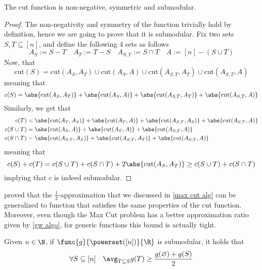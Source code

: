 \documentclass[a4paper, 12pt]{report}
\begin{document}
    \begin{framedprop}{}
        The cut function is non-negative, symmetric and submodular.
    \end{framedprop}

    \begin{proof}
        The non-negativity and symmetry of the function trivially hold by definition, hence we are going to prove that it is submodular. Fix two sets $S, T \subseteq [n]$, and define the following 4 sets as follows $$A_S := S - T \quad A_T := T - S \quad A_{S, T} := S \cap T \quad A := [n] - (S \cup T)$$ Now, that $$\mathrm{cut}(S) = \mathrm{cut}(A_S, A_T) \cup \mathrm{cut}(A_S, A) \cup \mathrm{cut}(A_{S, T}, A_T) \cup \mathrm{cut}(A_{S, T}, A)$$ meaning that $$c(S) = \abs{\mathrm{cut}(A_S, A_T)} + \abs{\mathrm{cut}(A_S, A)} + \abs{\mathrm{cut}(A_{S, T}, A_T)} + \abs{\mathrm{cut}(A_{S, T}, A)}$$ Similarly, we get that
        \begin{equation*}
            \begin{split}
                c(T) &= \abs{\mathrm{cut}(A_T, A_S)} + \abs{\mathrm{cut}(A_T, A)} + \abs{\mathrm{cut}(A_{S, T}, A_S)} + \abs{\mathrm{cut}(A_{S, T}, A)} \\
                c(S \cup T) &= \abs{\mathrm{cut}(A_S, A)} + \abs{\mathrm{cut}(A_T, A)} + \abs{\mathrm{cut}(A_{S, T}, A)} \\
                c(S \cap T) &= \abs{\mathrm{cut}(A_{S, T}, A_S)} + \abs{\mathrm{cut}(A_{S, T}, A_T)} + \abs{\mathrm{cut}(A_{S, T}, A)}
            \end{split}
        \end{equation*}
        meaning that $$c(S) + c(T) = c(S \cup T) + c(S \cap T) + 2 \abs{\mathrm{cut}(A_S, A_T)} \ge c(S \cup T) + c(S \cap T)$$ implying that $c$ is indeed submodular.
    \end{proof}

    \textcite{fmv} proved that the $\tfrac{1}{2}$-approximation that we discussed in \cref{max cut alg} can be generalized to  function that satisfies the same properties of the cut function. Moreover, even though the Max Cut problem has a better approximation ratio given by \cref{gw algo}, for generic functions this bound is actually tight.

    \begin{framedlem}{}
        Given $n \in \N$, if $\func{g}{\powerset([n])}{\R}$ is submodular, it holds that $$\forall S \subseteq [n] \quad \avg_{T \subseteq S}{g(T)} \ge \dfrac{g(\varnothing) + g(S)}{2}$$
    \end{framedlem}
\end{document}
